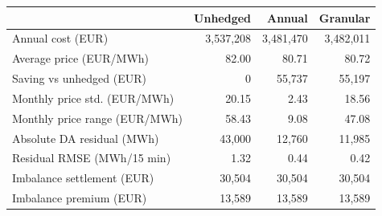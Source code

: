 {\small
\begin{tabular}{lrrr}
\toprule
 & Unhedged & Annual & Granular \\
\midrule
Annual cost (EUR) & 3,537,208 & 3,481,470 & 3,482,011 \\
Average price (EUR/MWh) & 82.00 & 80.71 & 80.72 \\
Saving vs unhedged (EUR) & 0 & 55,737 & 55,197 \\
Monthly price std. (EUR/MWh) & 20.15 & 2.43 & 18.56 \\
Monthly price range (EUR/MWh) & 58.43 & 9.08 & 47.08 \\
Absolute DA residual (MWh) & 43,000 & 12,760 & 11,985 \\
Residual RMSE (MWh/15 min) & 1.32 & 0.44 & 0.42 \\
Imbalance settlement (EUR) & 30,504 & 30,504 & 30,504 \\
Imbalance premium (EUR) & 13,589 & 13,589 & 13,589 \\
\bottomrule
\end{tabular}
}
